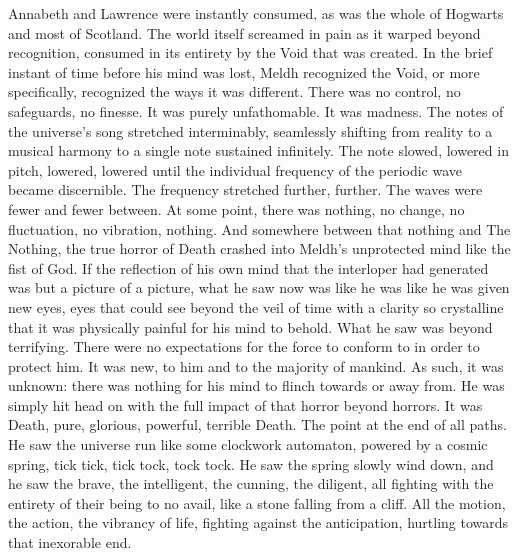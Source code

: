 Annabeth and Lawrence were instantly consumed, as was the whole of Hogwarts and most of Scotland. The world itself screamed in pain as it warped beyond recognition, consumed in its entirety by the Void that was created.
\simpleline
In the brief instant of time before his mind was lost, Meldh recognized the Void, or more specifically, recognized the ways it was different. There was no control, no safeguards, no finesse. It was purely unfathomable. It was madness.
\SmallVSpace
The notes of the universe’s song stretched interminably, seamlessly shifting from reality to a musical harmony to a single note sustained infinitely. The note slowed, lowered in pitch, lowered, lowered until the individual frequency of the periodic wave became discernible. The frequency stretched further, further. The waves were fewer and fewer between. At some point, there was nothing, no change, no fluctuation, no vibration, nothing.
\SmallVSpace
And somewhere between that nothing and The Nothing, the true horror of Death crashed into Meldh’s unprotected mind like the fist of God.
\SmallVSpace
If the reflection of his own mind that the interloper had generated was but a picture of a picture, what he saw now was like he was like he was given new eyes, eyes that could see beyond the veil of time with a clarity so crystalline that it was physically painful for his mind to behold.
\SmallVSpace
What he saw was beyond terrifying. There were no expectations for the force to conform to in order to protect him. It was new, to him and to the majority of mankind. As such, it was unknown: there was nothing for his mind to flinch towards or away from. He was simply hit head on with the full impact of that horror beyond horrors.
\SmallVSpace
It was Death, pure, glorious, powerful, terrible Death. The point at the end of all paths. He saw the universe run like some clockwork automaton, powered by a cosmic spring, tick tick, tick tock, tock tock. He saw the spring slowly wind down, and he saw the brave, the intelligent, the cunning, the diligent, all fighting with the entirety of their being to no avail, like a stone falling from a cliff. All the motion, the action, the vibrancy of life, fighting against the anticipation, hurtling towards that inexorable end.

